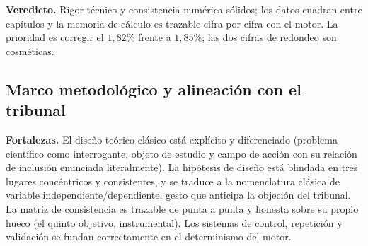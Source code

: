 \documentclass[11pt,a4paper]{article}
\begin{document}
\textbf{Veredicto.} Rigor técnico y consistencia numérica sólidos; los datos cuadran entre capítulos y
la memoria de cálculo es trazable cifra por cifra con el motor. La prioridad es corregir el
$1{,}82\%$ frente a $1{,}85\%$; las dos cifras de redondeo son cosméticas.

\subsection{Marco metodológico y alineación con el tribunal}

\textbf{Fortalezas.} El diseño teórico clásico está explícito y diferenciado (problema científico como
interrogante, objeto de estudio y campo de acción con su relación de inclusión enunciada
literalmente). La hipótesis de diseño está blindada en tres lugares concéntricos y consistentes, y se
traduce a la nomenclatura clásica de variable independiente/dependiente, gesto que anticipa la
objeción del tribunal. La matriz de consistencia es trazable de punta a punta y honesta sobre su
propio hueco (el quinto objetivo, instrumental). Los sistemas de control, repetición y validación se
fundan correctamente en el determinismo del motor.
\end{document}
